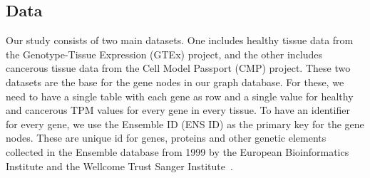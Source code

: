 \subsection{Data} \label{subsec:data}

Our study consists of two main datasets.
One includes healthy tissue data from the Genotype-Tissue Expression (GTEx) project,
and the other includes cancerous tissue data from the Cell Model Passport (CMP) project.
These two datasets are the base for the gene nodes in our graph database.
For these, we need to have a single table with each gene as row and a single value for healthy and cancerous TPM values for every gene in every tissue.
To have an identifier for every gene, we use the Ensemble ID (ENS ID) as the primary key for the gene nodes.
These are unique id for genes, proteins and other genetic elements collected in the Ensemble database
from 1999 by the European Bioinformatics Institute and the Wellcome Trust Sanger Institute~\cite{ensembl_project}.
\\


